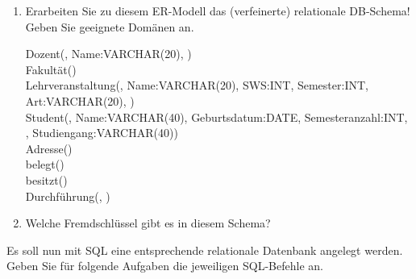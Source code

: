 \documentclass{lehramt-informatik-aufgabe}
\begin{document}
\renewcommand{\labelenumi}{(\alph{enumi})}
\begin{enumerate}
\item Erarbeiten Sie zu diesem ER-Modell das (verfeinerte) relationale
DB-Schema! Geben Sie geeignete
Domänen an.

\begin{antwort}
\ttfamily
\footnotesize
Dozent(, Name:VARCHAR(20),
)\\

Fakultät()\\

Lehrveranstaltung(, Name:VARCHAR(20), SWS:INT,
Semester:INT, Art:VARCHAR(20), )\\

Student(, Name:VARCHAR(40), Geburtsdatum:DATE,
Semesteranzahl:INT, ,
Studiengang:VARCHAR(40))\\

Adresse()\\

belegt()\\

besitzt()\\

Durchführung(, )\\
\end{antwort}

\item Welche Fremdschlüssel gibt es in diesem Schema?
\end{enumerate}

\noindent
Es soll nun mit SQL eine entsprechende relationale Datenbank
angelegt werden. Geben Sie für folgende Aufgaben die jeweiligen
SQL-Befehle an.
\end{document}
